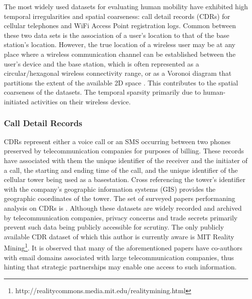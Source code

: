 \documentclass[journal]{IEEEtran}
\begin{document}
The most widely used datasets for evaluating human mobility have exhibited high temporal irregularities and spatial coarseness: call detail records (CDRs) for cellular telephones and WiFi Access Point registration logs. Common between these two data sets is the association of a user's location to that of the base station's location. However, the true location of a wireless user may be at any place where a wireless communication channel can be established between the user's device and the base station, which is often represented as a circular/hexagonal wireless connectivity range, or as a Voronoi diagram that partitions the extent of the available 2D space \cite{gonzalez_understanding_2008,song_limits_2010}. This contributes to the spatial coarseness of the datasets. The temporal sparsity primarily due to human-initiated activities on their wireless device.
    
\subsubsection{Call Detail Records}

CDRs represent either a voice call or an SMS occurring between two phones preserved by telecommunication companies for purposes of billing. These records have associated with them the unique identifier of the receiver and the initiater of a call, the starting and ending time of the call, and the unique identifier of the cellular tower being used as a basestation. Cross referencing the tower's identifier with the company's geographic information systems (GIS) provides the geographic coordinates of the tower. The set of surveyed papers performaning analysis on CDRs is \cite{gonzalez_understanding_2008, song_limits_2010, deville_dynamic_2014, schneider_unravelling_2013, zhang_exploring_2014, zhang_user_2014, lu_approaching_2013, motahari_impact_2012, isaacman_human_2012, chon_evaluating_2012, cho_friendship_2011, leontiadis_cells_2014, ranjan_are_2012, gatmir-motahari_time-clustering-based_2013, zhang_nextcell:_2013}. Although these datasets are widely recorded and archived by telecommunication companies, privacy concerns and trade secrets primarily prevent such data being publicly accessible for scrutiny. The only publicly available CDR dataset of which this author is currently aware is MIT Reality Mining\footnote{http://realitycommons.media.mit.edu/realitymining.html}. It is observed that many of the aforementioned papers have co-authors with email domains associated with large telecommunication companies, thus hinting that strategic partnerships may enable one access to such information.
\end{document}
